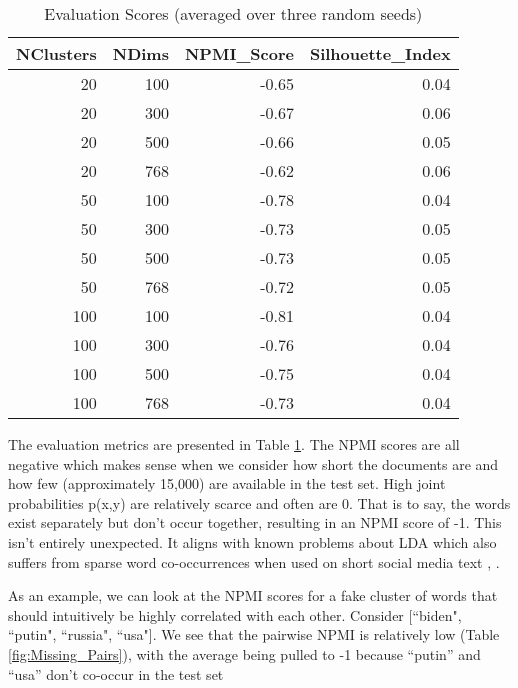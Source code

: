 \documentclass [11pt, proquest] {uwthesis}[2020/02/24]
\begin{document}
\begin{table}
\centering
\caption{Evaluation Scores (averaged over three random seeds)}
\begin{tabular}{rrrr}
\toprule
 NClusters &  NDims &  NPMI\_Score &  Silhouette\_Index \\
\midrule
        20 &    100 &       -0.65 &              0.04 \\
        20 &    300 &       -0.67 &              0.06 \\
        20 &    500 &       -0.66 &              0.05 \\
        20 &    768 &       -0.62 &              0.06 \\
        50 &    100 &       -0.78 &              0.04 \\
        50 &    300 &       -0.73 &              0.05 \\
        50 &    500 &       -0.73 &              0.05 \\
        50 &    768 &       -0.72 &              0.05 \\
       100 &    100 &       -0.81 &              0.04 \\
       100 &    300 &       -0.76 &              0.04 \\
       100 &    500 &       -0.75 &              0.04 \\
       100 &    768 &       -0.73 &              0.04 \\
\bottomrule
\end{tabular}
\label{fig:Cluster_Evaluation}
\end{table}



The evaluation metrics are presented in Table \ref{fig:Cluster_Evaluation}. The NPMI scores are all negative which makes sense when we consider how short the documents are and how few (approximately 15,000) are available in the test set. High joint probabilities p(x,y) are relatively scarce and often are 0.  That is to say, the words exist separately but don’t occur together, resulting in an NPMI score of -1. This isn't entirely unexpected. It aligns with known problems about LDA which also suffers from sparse word co-occurrences when used on short social media text \citep{chen2016short}, \citep{pang2016mr}.

As an example, we can look at the NPMI scores for a fake cluster of words that should intuitively be highly correlated with each other. Consider [``biden", ``putin", ``russia", ``usa"]. We see that the pairwise NPMI is relatively low (Table \ref{fig:Missing_Pairs}), with the average being pulled to -1 because “putin” and “usa” don’t co-occur in the test set
\end{document}
